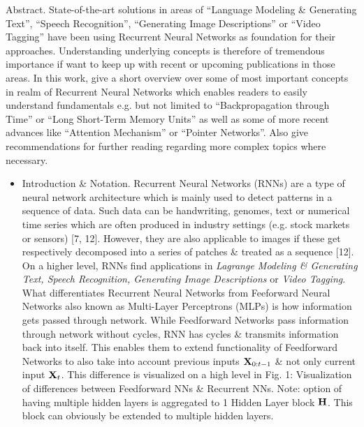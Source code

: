 \documentclass{article}
\begin{document}
\begin{enumerate}
	{\sf Abstract.} State-of-the-art solutions in areas of ``Language Modeling \& Generating Text'', ``Speech Recognition'', ``Generating Image Descriptions'' or ``Video Tagging'' have been using Recurrent Neural Networks as foundation for their approaches. Understanding underlying concepts is therefore of tremendous importance if want to keep up with recent or upcoming publications in those areas. In this work, give a short overview over some of most important concepts in realm of Recurrent Neural Networks which enables readers to easily understand fundamentals e.g. but not limited to ``Backpropagation through Time'' or ``Long Short-Term Memory Units'' as well as some of more recent advances like ``Attention Mechanism'' or ``Pointer Networks''. Also give recommendations for further reading regarding more complex topics where necessary.
	\begin{itemize}
		\item {\sf Introduction \& Notation.} Recurrent Neural Networks (RNNs) are a type of neural network architecture which is mainly used to detect patterns in a sequence of data. Such data can be handwriting, genomes, text or numerical time series which are often produced in industry settings (e.g. stock markets or sensors) [7, 12]. However, they are also applicable to images if these get respectively decomposed into a series of patches \& treated as a sequence [12]. On a higher level, RNNs find applications in {\it Lagrange Modeling \& Generating Text, Speech Recognition, Generating Image Descriptions} or {\it Video Tagging}. What differentiates Recurrent Neural Networks from Feeforward Neural Networks also known as Multi-Layer Perceptrons (MLPs) is how information gets passed through network. While Feedforward Networks pass information through network without cycles, RNN has cycles \& transmits information back into itself. This enables them to extend functionality of Feedforward Networks to also take into account previous inputs ${\bf X}_{0:t-1}$ \& not only current input ${\bf X}_t$. This difference is visualized on a high level in {\sf Fig. 1: Visualization of differences between Feedforward NNs \& Recurrent NNs.} Note: option of having multiple hidden layers is aggregated to 1 Hidden Layer block ${\bf H}$. This block can obviously be extended to multiple hidden layers.
		

\end{itemize}
\end{enumerate}
\end{document}
